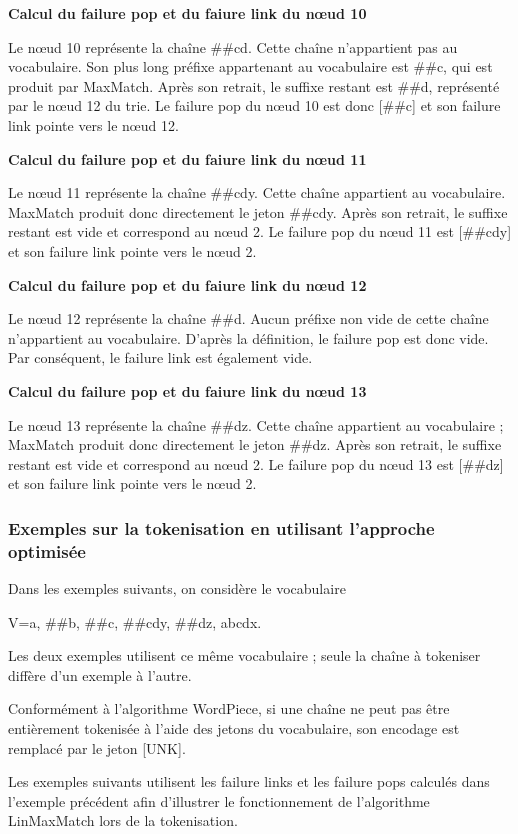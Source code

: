 \documentclass[12pt,a4paper]{report}
\begin{document}
	\textbf{Calcul du failure pop et du faiure link du nœud 10}
	
	Le nœud 10 représente la chaîne \#\#cd. Cette chaîne n'appartient pas au vocabulaire. Son plus long préfixe appartenant au vocabulaire est \#\#c, qui est produit par MaxMatch. Après son retrait, le suffixe restant est \#\#d, représenté par le nœud 12 du trie. Le failure pop du nœud 10 est donc [\#\#c] et son failure link pointe vers le nœud 12.
	
	\textbf{Calcul du failure pop et du faiure link du nœud 11}
	
	Le nœud 11 représente la chaîne \#\#cdy. Cette chaîne appartient au vocabulaire. MaxMatch produit donc directement le jeton \#\#cdy. Après son retrait, le suffixe restant est vide et correspond au nœud 2. Le failure pop du nœud 11 est [\#\#cdy] et son failure link pointe vers le nœud 2.
	
	\textbf{Calcul du failure pop et du faiure link du nœud 12}
	
	Le nœud 12 représente la chaîne \#\#d. Aucun préfixe non vide de cette chaîne n'appartient au vocabulaire. D'après la définition, le failure pop est donc vide. Par conséquent, le failure link est également vide.
	
	\textbf{Calcul du failure pop et du faiure link du nœud 13}
	
	Le nœud 13 représente la chaîne \#\#dz. Cette chaîne appartient au vocabulaire ; MaxMatch produit donc directement le jeton \#\#dz. Après son retrait, le suffixe restant est vide et correspond au nœud 2. Le failure pop du nœud 13 est [\#\#dz] et son failure link pointe vers le nœud 2.
	
	\subsubsection{Exemples sur la tokenisation en utilisant l'approche optimisée}
	
	Dans les exemples suivants, on considère le vocabulaire
	
	V={a, \#\#b, \#\#c, \#\#cdy, \#\#dz, abcdx}.
	
	Les deux exemples utilisent ce même vocabulaire ; seule la chaîne à tokeniser diffère d'un exemple à l'autre.
	
	Conformément à l'algorithme WordPiece, si une chaîne ne peut pas être entièrement tokenisée à l'aide des jetons du vocabulaire, son encodage est remplacé par le jeton [UNK].
	
	Les exemples suivants utilisent les failure links et les failure pops calculés dans l'exemple précédent afin d'illustrer le fonctionnement de l'algorithme LinMaxMatch lors de la tokenisation.
	
\end{document}
